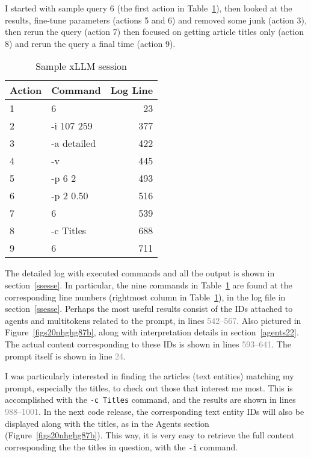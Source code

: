 \documentclass[10pt]{article}
\renewcommand{\arraystretch}{1.4} %
\begin{document}
{I started with sample query 6 (the first action in Table~\ref{gtfjibs8baoj}), then looked at the results, fine-tune parameters (actions 5 and 6) and removed some junk (action 3), then rerun the query (action 7) then focused on getting article titles only (action 8) and rerun the query a final time (action 9).

\renewcommand{\arraystretch}{1.1}
\begin{table}[!h]
\begin{center}
\begin{tabular}{llr} 
 \hline
 Action & Command & Log Line \\ %
\hline
\hline
 1 & 6 & 23 \\ 
 2 & -i 107 259 & 377  \\
 3 & -a detailed & 422\\
 4 & -v & 445  \\
 5 & -p 6  2 & 493 \\ %
6 & -p 2  0.50 & 516\\
7 & 6 & 539\\
8 & -c Titles & 688 \\
9 & 6 & 711\\
 \hline
\end{tabular}
\caption{Sample xLLM session}
\label{gtfjibs8baoj}
\end{center}
\end{table}
\renewcommand{\arraystretch}{1.0}



\noindent The detailed log with executed commands and all the output is shown in section~\ref{ssesse}. In particular, the nine commands 
in Table~\ref{gtfjibs8baoj} are found at 
the corresponding line numbers (rightmost column in Table~\ref{gtfjibs8baoj}), in the log file in section~\ref{ssesse}. Perhaps the most useful results consist of the IDs attached to agents and multitokens related to the prompt, in lines \textcolor{gray}{542--567}. Also
 pictured in Figure~\ref{figs20nhghg87b}, along with interpretation details in section~\ref{agents22}. The actual content
 corresponding to these IDs is shown in lines \textcolor{gray}{593--641}. The prompt itself is shown in 
line \textcolor{gray}{24}.

I was particularly interested in finding the articles (text entities) matching my prompt, especially the titles, to check out those that interest me most. 
This is accomplished with the \texttt{-c Titles} command, and the results are shown in lines \textcolor{gray}{988--1001}. 
In the next code release, the corresponding text entity IDs will also be 
displayed along with the titles, as in the Agents section (Figure~\ref{figs20nhghg87b}). This way, it is very easy to retrieve the full content
 corresponding the the titles in question, with the \texttt{-i} command. 

}
\end{document}

